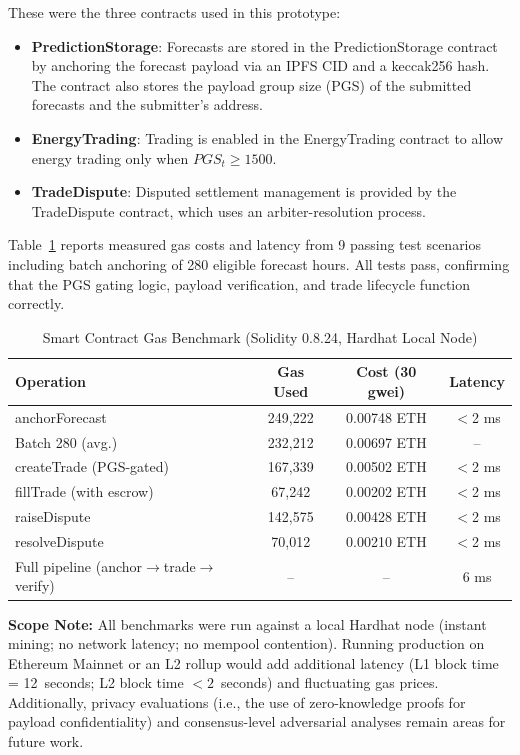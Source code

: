\documentclass{ieeeaccess}
\begin{document}
These were the three contracts used in this prototype:

\begin{itemize}
\item \textbf{PredictionStorage}: Forecasts are stored in the PredictionStorage contract by anchoring the forecast payload via an IPFS CID and a keccak256 hash. The contract also stores the payload group size (PGS) of the submitted forecasts and the submitter's address.

\item \textbf{EnergyTrading}: Trading is enabled in the EnergyTrading contract to allow energy trading only when $PGS_t \ge 1500$.

\item \textbf{TradeDispute}: Disputed settlement management is provided by the TradeDispute contract, which uses an arbiter-resolution process.
\end{itemize}

Table~\ref{tab:gas_benchmark} reports measured gas costs and latency from 9 passing test scenarios including batch anchoring of 280 eligible forecast hours. All tests pass, confirming that the PGS gating logic, payload verification, and trade lifecycle function correctly.

\begin{table}[!t]
\caption{Smart Contract Gas Benchmark (Solidity 0.8.24, Hardhat Local Node)}
\label{tab:gas_benchmark}
\centering
\begin{tabular}{lccc}
\toprule
Operation & Gas Used & Cost (30 gwei) & Latency \\
\midrule
anchorForecast & 249,222 & 0.00748 ETH & $<$2 ms \\
Batch 280 (avg.) & 232,212 & 0.00697 ETH & -- \\
createTrade (PGS-gated) & 167,339 & 0.00502 ETH & $<$2 ms \\
fillTrade (with escrow) & 67,242 & 0.00202 ETH & $<$2 ms \\
raiseDispute & 142,575 & 0.00428 ETH & $<$2 ms \\
resolveDispute & 70,012 & 0.00210 ETH & $<$2 ms \\
\midrule
Full pipeline (anchor$\rightarrow$trade$\rightarrow$verify) & -- & -- & 6 ms \\
\bottomrule
\end{tabular}
\end{table}
\textbf{Scope Note:} All benchmarks were run against a local Hardhat node (instant mining; no network latency; no mempool contention). Running production on Ethereum Mainnet or an L2 rollup would add additional latency (L1 block time = 12~seconds; L2 block time $< 2$~seconds) and fluctuating gas prices. Additionally, privacy evaluations (i.e., the use of zero-knowledge proofs for payload confidentiality) and consensus-level adversarial analyses remain areas for future work.
\end{document}
